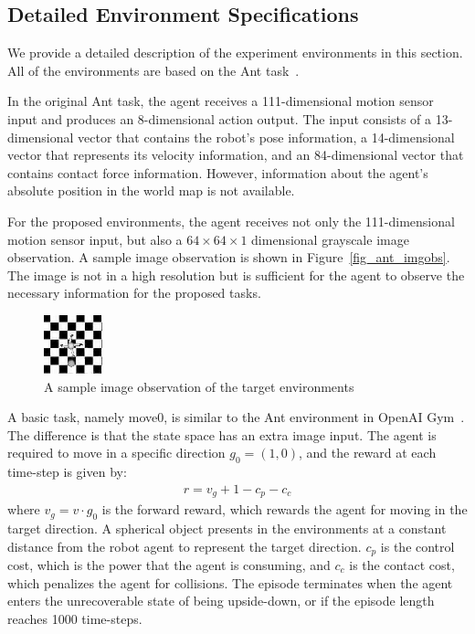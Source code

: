 
\subsection{Detailed Environment Specifications}
We provide a detailed description of the experiment environments in this section. All of the environments are based on the Ant task~\cite{openaigym}. 

In the original Ant task, the agent receives a 111-dimensional motion sensor input and produces an 8-dimensional action output. The input consists of a 13-dimensional vector that contains the robot's pose information, a 14-dimensional vector that represents its velocity information, and an 84-dimensional vector that contains contact force information. However, information about the agent's absolute position in the world map is not available.

For the proposed environments, the agent receives not only the 111-dimensional motion sensor input, but also a $64\times 64\times 1$ dimensional grayscale image observation. A sample image observation is shown in Figure~\ref{fig_ant_imgobs}. The image is not in a high resolution but is sufficient for the agent to observe the necessary information for the proposed tasks.

\begin{figure}[H]
	\includegraphics{images/ant_imgobs.png}
	\centering
	\caption{A sample image observation of the target environments}
\end{figure}\label{fig_ant_imgobs}

A basic task, namely move0, is similar to the Ant environment in OpenAI Gym~\cite{openaigym}. The difference is that the state space has an extra image input. The agent is required to move in a specific direction $g_0=(1,0)$, and the reward at each time-step is given by:
\begin{align}
r = v_g + 1-c_p-c_c
\end{align}
where $v_g=v \cdot g_0$ is the forward reward, which rewards the agent for moving in the target direction. A spherical object presents in the environments at a constant distance from the robot agent to represent the target direction.  $c_p$ is the control cost, which is the power that the agent is consuming, and $c_c$ is the contact cost, which penalizes the agent for collisions. The episode terminates when the agent enters the unrecoverable state of being upside-down, or if the episode length reaches 1000 time-steps.

